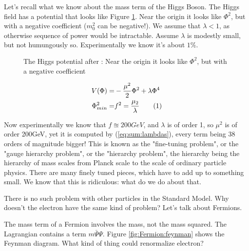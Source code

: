 \documentclass[]{article}
\newcommand\numberthis{\addtocounter{equation}{1}\tag{\theequation}}
\begin{document}
Let's recall what we know about the mass term of the Higgs Boson. The Higgs field has a potential that looks like Figure \ref{fig:higgs-potential}. Near the origin it looks like $\Phi^2$, but with a negative coefficient ($m_0^2$ can be negative!). We assume that $\lambda<1$, as otherwise sequence of power would be intractable. Assume $\lambda$ is modestly small, but not humungously so. Experimentally we know it's about $1\%$.

\begin{figure}[H]
	\begin{center}
		\caption[The Higgs potential]{The Higgs potential after \cite{susskind2010standard}: Near the origin it looks like $\Phi^2$, but with a negative coefficient }\label{fig:higgs-potential}
	\end{center}
\end{figure}

\begin{align*}
	V(\Phi) =& - \frac{\mu^2}{2} \Phi^2 + \lambda \Phi^4\\
	\Phi_{min}^2 =& f^2 = \frac{\mu_2}{\lambda} \numberthis \label{eg:higgs:minimum}
\end{align*}

Now experimentally we know that $f\approxeq200GeV$, and $\lambda$ is of order 1, so $\mu^2$ is of order 200GeV, yet it is computed by (\ref{eq:sum:lambdas}), every term being 38 orders of magnitude bigger! This is known as the "fine-tuning problem", or the "gauge hierarchy problem", or the "hierarchy problem", the hierarchy being the hierarchy of mass scales from Planck scale to the scale of ordinary particle physics. There are many finely tuned pieces, which have to add up to something small. We know that this is ridiculous: what do we do about that.

There is no such problem with other particles in the Standard Model. Why doesn't the electron have the same kind of problem? Let's talk about Fermions.

The mass term of a Fermion involves the mass, not the mass squared. The Lagrangian contains a term $m \bar{\Psi} \Psi$. Figure \ref{fig:Fermion:feynman} shows the Feynman diagram. What kind of thing could renormalize electron?
\end{document}
